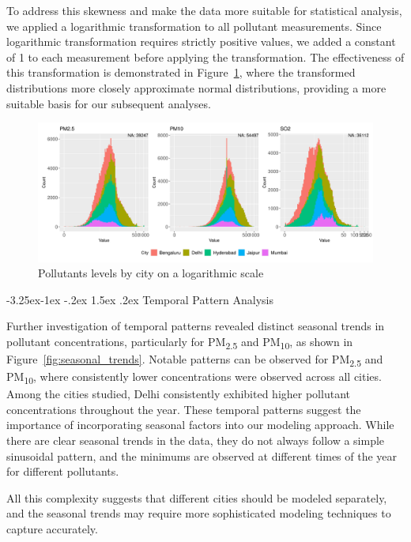 \documentclass[twoside,11pt]{article}
\makeatletter
\renewcommand\subsubsection{\@startsection{subsubsection}{3}{\z@}%
  {-3.25ex\@plus -1ex \@minus -.2ex}%
  {1.5ex \@plus .2ex}%
  {\normalfont\bfseries\normalsize}}
\makeatother
\begin{document}
To address this skewness and make the data more suitable for statistical analysis, we applied a logarithmic transformation to all pollutant measurements. Since logarithmic transformation requires strictly positive values, we added a constant of 1 to each measurement before applying the transformation. The effectiveness of this transformation is demonstrated in Figure~\ref{fig:log_scaled_pollutants}, where the transformed distributions more closely approximate normal distributions, providing a more suitable basis for our subsequent analyses.

\begin{figure}[H]
  \centering
  \includegraphics[width=\textwidth]{assets/log-scaled-pollutants.png}
  \caption{Pollutants levels by city on a logarithmic scale}
  \label{fig:log_scaled_pollutants}
\end{figure}

\subsubsection{Temporal Pattern Analysis}

Further investigation of temporal patterns revealed distinct seasonal trends in pollutant concentrations, particularly for PM\textsubscript{2.5} and PM\textsubscript{10}, as shown in Figure~\ref{fig:seasonal_trends}. Notable patterns can be observed for PM\textsubscript{2.5} and PM\textsubscript{10}, where consistently lower concentrations were observed across all cities. Among the cities studied, Delhi consistently exhibited higher pollutant concentrations throughout the year. These temporal patterns suggest the importance of incorporating seasonal factors into our modeling approach. While there are clear seasonal trends in the data, they do not always follow a simple sinusoidal pattern, and the minimums are observed at different times of the year for different pollutants.

All this complexity suggests that different cities should be modeled separately, and the seasonal trends may require more sophisticated modeling techniques to capture accurately.
\end{document}
